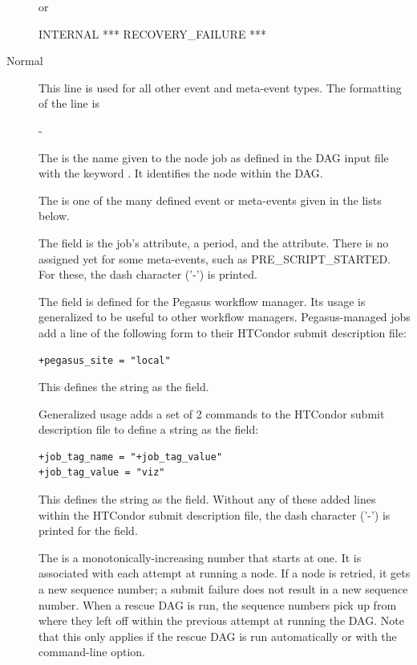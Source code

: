 \begin{description}
or

 INTERNAL *** RECOVERY\_FAILURE ***

\item [Normal]
This line is used for all other event and meta-event types.
The formatting of the line is

     - 

The  is the name given to the node job as defined in
the DAG input file with the keyword .
It identifies the node within the DAG.

The  is one of the many defined event or meta-events given
in the lists below.

The  field is the job's 
 attribute, a period, and the  attribute. 
There is no  assigned yet for some meta-events,
such as PRE\_SCRIPT\_STARTED.
For these, the dash character ('-') is printed. 

The  field is defined for the Pegasus workflow manager.
Its usage is generalized to be useful to other workflow managers.
Pegasus-managed jobs add a line of the following form to their
HTCondor submit description file:
\begin{verbatim}
+pegasus_site = "local"
\end{verbatim}
This defines the string  as the  field.
 
Generalized usage adds a set of 2 commands to the HTCondor
submit description file to define a string as the  field:
\begin{verbatim}
+job_tag_name = "+job_tag_value"
+job_tag_value = "viz"
\end{verbatim}
This defines the string  as the  field.
Without any of these added lines within the HTCondor submit description file,
the dash character ('-') is printed for the  field. 

The  is a monotonically-increasing number 
that starts at one.
It is associated with each attempt at running a node.
If a node is retried, it gets a new sequence number;
a submit failure does not result in a new sequence number.
When a rescue DAG is run,
the sequence numbers pick up from where they left off within the previous
attempt at running the DAG.
Note that this only applies if the rescue
DAG is run automatically or with the  command-line option.

\end{description}


